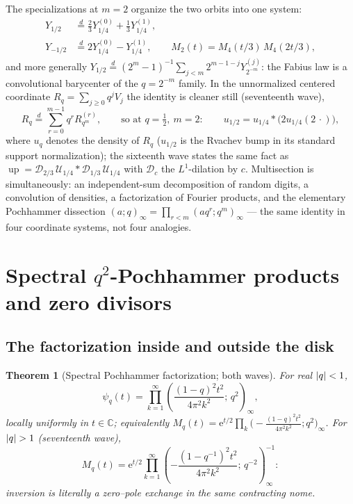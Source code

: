 \documentclass[11pt,oneside]{article}
\numberwithin{equation}{section}
\newtheorem{theorem}{Theorem}[section]
\theoremstyle{definition}
\theoremstyle{remark}
\newcommand{\C}{\mathbb C}
\newcommand{\Up}{\operatorname{up}}
\newcommand{\e}{\mathrm e}
\begin{document}
The specializations at $m=2$ organize the two orbits into one system:
\begin{align}
 Y_{1/2}&\overset d=\tfrac23Y_{1/4}^{(0)}+\tfrac13Y_{1/4}^{(1)},
 \label{p7:eq:half-quarter}\\
 Y_{-1/2}&\overset d=2Y_{1/4}^{(0)}-Y_{1/4}^{(1)},
 \qquad
 M_2(t)=M_4(t/3)\,M_4(2t/3),
 \label{p7:eq:signed-reciprocal-decimation}
\end{align}
and more generally
$Y_{1/2}\overset d=(2^m-1)^{-1}\sum_{j<m}2^{m-1-j}Y_{2^{-m}}^{(j)}$: the
Fabius law is a convolutional barycenter of the $q=2^{-m}$ family.  In the
unnormalized centered coordinate $R_q=\sum_{j\ge0}q^jV_j$ the identity is
cleaner still (seventeenth wave),
\begin{equation}\label{p7:eq:R-multisection}
 R_q\overset d=\sum_{r=0}^{m-1}q^rR_{q^m}^{(r)},
 \qquad\text{so at }q=\tfrac12,\ m=2:\qquad
 u_{1/2}=u_{1/4}*\bigl(2u_{1/4}(2\,\cdot)\bigr),
\end{equation}
where $u_q$ denotes the density of $R_q$ ($u_{1/2}$ is the Rvachev bump in
its standard support normalization); the sixteenth wave states the same fact
as $\Up=\mathcal D_{2/3}\,\mathcal U_{1/4}*\mathcal D_{1/3}\,\mathcal U_{1/4}$
with $\mathcal D_c$ the $L^1$-dilation by $c$.  Multisection is
simultaneously: an independent-sum decomposition of random digits, a
convolution of densities, a factorization of Fourier products, and the
elementary Pochhammer dissection
$(a;q)_\infty=\prod_{r<m}(aq^r;q^m)_\infty$ --- the same identity in four
coordinate systems, not four analogies.

\section{Spectral \texorpdfstring{$q^2$}{q\^2}-Pochhammer products and zero divisors}
\label{p7:sec:spectral}

\subsection{The factorization inside and outside the disk}

\begin{theorem}[Spectral Pochhammer factorization; both waves]
\label{p7:thm:sinc-poch}
For real $\left\lvert q\right\rvert<1$,
\begin{equation}\label{p7:eq:sinc-poch}
 \boxed{\ \psi_q(t)=\prod_{k=1}^{\infty}
 \left(\frac{(1-q)^2t^2}{4\pi^2k^2};\,q^2\right)_{\!\infty},\ }
\end{equation}
locally uniformly in $t\in\C$; equivalently
$M_q(t)=\e^{t/2}\prod_k\bigl(-\tfrac{(1-q)^2t^2}{4\pi^2k^2};q^2\bigr)_\infty$.
For $\left\lvert q\right\rvert>1$ (seventeenth wave),
\begin{equation}\label{p7:eq:sinc-poch-outside}
 M_q(t)=\e^{t/2}\prod_{k=1}^{\infty}
 \left(-\frac{(1-q^{-1})^2t^2}{4\pi^2k^2};\,q^{-2}\right)_{\!\infty}^{-1}:
\end{equation}
inversion is literally a zero--pole exchange in the same contracting nome.
\end{theorem}
\end{document}
